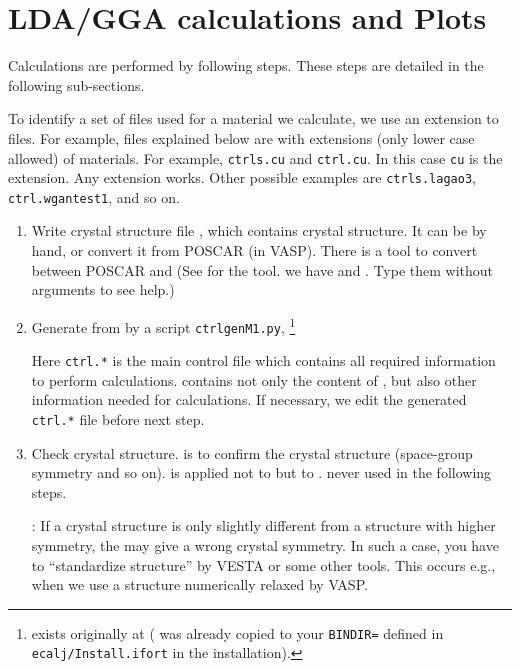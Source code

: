 \section{LDA/GGA calculations and Plots}
\label{ldagga}
Calculations are performed by following steps. 
These steps are detailed in the following sub-sections. 

To identify a set of files used for a material we calculate, we use 
an extension to files. For example, files explained below are
with extensions (only lower case allowed) of materials.
For example, \verb+ctrls.cu+ and \verb+ctrl.cu+. In this case
\verb+cu+ is the extension. Any extension works. Other possible examples are
\verb+ctrls.lagao3+, \verb+ctrl.wgantest1+, and so on.

\begin{enumerate}
\item Write crystal structure file \ctrls, which contains crystal structure.
  It can be by hand, or convert it from POSCAR (in VASP). There
  is a tool to convert between POSCAR and \ctrls
  (See  for the tool.
  we have  and . Type them without
      arguments to see help.)

\item Generate \ctrl from \ctrls by a script \verb+ctrlgenM1.py+,
      \footnote{ exists originally at 
       ( was already copied to your 
       {\tt BINDIR=} defined in {\tt ecalj/Install.ifort} in the installation).}
 
     Here \verb+ctrl.*+ is the main control file which contains all required
     information to perform calculations.  contains not only
      the content of \ctrls, but also other information 
     needed for calculations.
     If necessary, we edit the generated \verb+ctrl.*+ file before next step.

\item
     Check crystal structure. \lmchk is to confirm the crystal structure
     (space-group symmetry and so on). \lmchk is applied not to
     \ctrls but to \ctrl. \ctrls never used in the following steps.

     :
      If a crystal structure is only slightly different from a
     structure with higher symmetry, the \lmchk may give a wrong crystal
     symmetry. In such a case, you have to ``standardize structure'' by
     VESTA or some other tools. This occurs e.g., when we use a structure
     numerically relaxed by VASP.


\end{enumerate}
